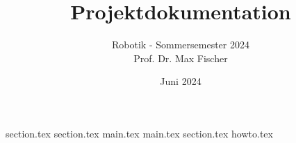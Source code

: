 \documentclass{scrartcl}
\title{Projektdokumentation}
\subtitle{Robotik - Sommersemester 2024\\Prof. Dr. Max Fischer}
\date{Juni 2024}
\begin{document}
\maketitle

\tableofcontents
\newpage

{section.tex}
{section.tex}
{main.tex}
{main.tex}
{section.tex}
{howto.tex}

\printbibliography[heading=bibintoc,title=Literaturverzeichnis]
\listoffigures
\end{document}

